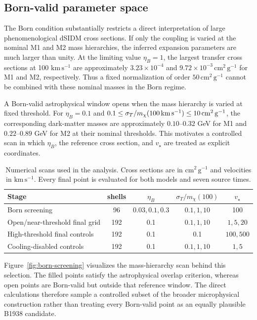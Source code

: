 \documentclass[12pt]{article}
\newcommand{\sigmavm}{\sigma_T/m_\chi}
\newcommand{\vstar}{v_\star}
\begin{document}
\subsection{Born-valid parameter space}

The Born condition substantially restricts a direct interpretation of large
phenomenological dSIDM cross sections.  If only the coupling is varied at the
nominal M1 and M2 mass hierarchies, the inferred expansion parameters are much
larger than unity.  At the limiting value $\eta_B=1$, the largest transfer
cross sections at 100 $\mathrm{km\,s^{-1}}$ are approximately
$3.23\times10^{-4}$ and $9.72\times10^{-3}\,\mathrm{cm^2\,g^{-1}}$ for M1
and M2, respectively.  Thus a fixed normalization of order
$50\,\mathrm{cm^2\,g^{-1}}$ cannot be combined with these nominal masses in
the Born regime.

A Born-valid astrophysical window opens when the mass hierarchy is varied at
fixed threshold.  For $\eta_B=0.1$ and
$0.1\leq\sigmavm(100\,{\rm km\,s^{-1}})\leq10\,\mathrm{cm^2\,g^{-1}}$, the
corresponding dark-matter masses are approximately $0.10$--$0.32$ GeV for M1
and $0.22$--$0.89$ GeV for M2 at their nominal thresholds.  This motivates a
controlled scan in which $\eta_B$, the reference cross section, and $\vstar$
are treated as explicit coordinates.

\begin{table}[t]
\centering
\caption{Numerical scans used in the analysis.  Cross sections are in
$\mathrm{cm^2\,g^{-1}}$ and velocities in $\mathrm{km\,s^{-1}}$.  Every final
point is evaluated for both models and seven source times.}
\label{tab:scan-design}
\small
\begin{tabular}{lcccc}
\toprule
Stage & shells & $\eta_B$ & $\sigmavm(100)$ & $\vstar$\\
\midrule
Born screening & 96 & $0.03,0.1,0.3$ & $0.1,1,10$ & 100\\
Open/near-threshold final grid & 192 & 0.1 & $0.1,1,10$ & $1,5,20$\\
High-threshold final controls & 192 & 0.1 & 0.1 & $100,500$\\
Cooling-disabled controls & 192 & 0.1 & $0.1,1,10$ & $1,5$\\
\bottomrule
\end{tabular}
\end{table}

Figure~\ref{fig:born-screening} visualizes the mass-hierarchy scan behind this
selection.  The filled points satisfy the astrophysical overlap criterion,
whereas open points are Born-valid but outside that reference window.  The
direct calculations therefore sample a controlled subset of the broader
microphysical construction rather than treating every Born-valid point as an
equally plausible B1938 candidate.
\end{document}
